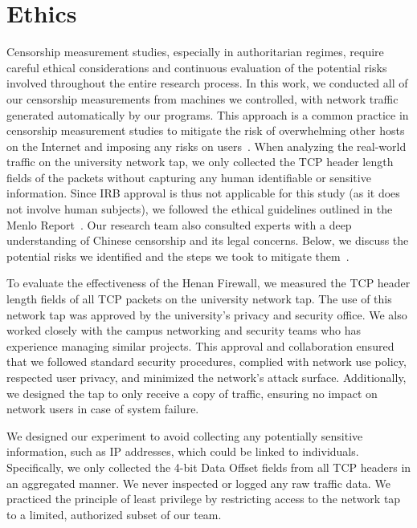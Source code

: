 \documentclass[conference,compsoc]{IEEEtran}
\begin{document}
\section{Ethics}
\label{sec:ethics}

Censorship measurement studies,
especially in authoritarian regimes,
require careful ethical considerations
and continuous evaluation of the potential risks involved
throughout the entire research process.
%
In this work,
we conducted all of our censorship measurements from machines we controlled,
with network traffic generated automatically by our programs.
This approach is a common practice in censorship measurement studies
to mitigate the risk of overwhelming other hosts on the Internet
and imposing any risks on users~\cite{Wu2023a, Alice2020a, Hoang2024a, Hoang2021a, Anonymous2020a}.
When analyzing the real-world traffic on the university network tap,
we only collected the TCP header length fields of the packets
without capturing any human identifiable or sensitive information.
Since IRB approval is thus not applicable for this study (as it does not involve human subjects),
we followed the ethical guidelines outlined in the Menlo Report~\cite{menlo-report}.
Our research team also consulted experts with a deep understanding of
Chinese censorship and its legal concerns.
Below,
we discuss the potential risks we identified and the steps we took to mitigate them~\cite[\S C.3.2]{menlo-report}.

%
To evaluate the effectiveness of the Henan Firewall,
we measured the TCP header length fields of all TCP packets on the university network tap.
The use of this network tap was approved by the university's privacy and security office.
We also worked closely with the campus networking and security teams who has experience managing similar projects.
This approval and collaboration ensured that
we followed standard security procedures,
complied with network use policy,
respected user privacy,
and minimized the network’s attack surface.
Additionally, we designed the tap to only receive a copy of traffic,
ensuring no impact on network users in case of system failure.

We designed our experiment to avoid collecting any potentially sensitive information,
such as IP addresses,
which could be linked to individuals.
Specifically, we only collected the 4-bit Data Offset fields from all TCP headers in an aggregated manner.
We never inspected or logged any raw traffic data.
%
We practiced the principle of least privilege
by restricting access to the network tap to a limited,
authorized subset of our team.
\end{document}

